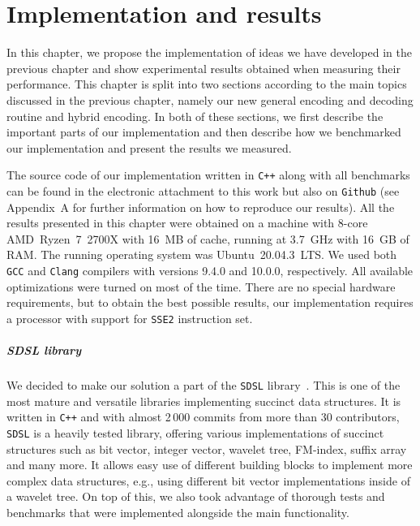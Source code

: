 \chapter{Implementation and results}
\label{kap:kap4}

In this chapter, we propose the implementation of ideas we have developed in the previous
chapter and show experimental results obtained when measuring their performance.
This chapter is split into two sections according to the main topics discussed
in the previous chapter, namely our new general encoding and decoding routine and hybrid
encoding. In both of these sections, we first describe the important parts of our
implementation and then describe how we benchmarked our implementation and present the
results we measured.

The source code of our implementation written in \texttt{C++} along with all benchmarks can
be found in the electronic attachment to this work but also on \texttt{Github} (see Appendix~A
for further information on how to reproduce our results). All the results presented in this
chapter were obtained on a machine with 8-core AMD~Ryzen~7~2700X with 16~MB of cache, running
at 3.7~GHz with 16~GB of RAM. The running operating system was Ubuntu~20.04.3~LTS. We used both
\texttt{GCC} and \texttt{Clang} compilers with versions 9.4.0 and 10.0.0, respectively. All
available optimizations were turned on most of the time. There are no special hardware requirements,
but to obtain the best possible results, our implementation requires a processor with support for
\texttt{SSE2} instruction set.

\paragraph{SDSL library}

We decided to make our solution a part of the \texttt{SDSL} library~\citep{gog2014theory}. This
is one of the most mature and versatile libraries implementing succinct data structures. It is
written in \texttt{C++} and with almost 2\,000 commits from more than 30 contributors, \texttt{SDSL}
is a heavily tested library, offering various implementations of succinct structures such as
bit vector, integer vector, wavelet tree, FM-index, suffix array and many more. It allows easy use
of different building blocks to implement more complex data structures, e.g., using different bit vector
implementations inside of a wavelet tree. On top of this, we also took advantage of thorough tests
and benchmarks that were implemented alongside the main functionality.

